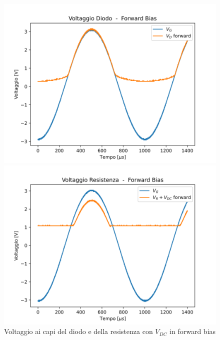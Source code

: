 \begin{figure}
    \centering
    \begin{minipage}{0.475\textwidth}
        \centering
        \includegraphics[width=1\textwidth]{Diodo 3.2.(4-5)/DC_V_D_Forward.png}
    \end{minipage}
    \hfill
    \begin{minipage}{0.475\textwidth}
        \centering
        \includegraphics[width=1\textwidth]{Diodo 3.2.(4-5)/DC_V_R_Forward.png}
    \end{minipage}
    \caption{Voltaggio ai capi del diodo e della resistenza con $V_{DC}$ in forward bias}
    \label{3.2.4}
\end{figure}

